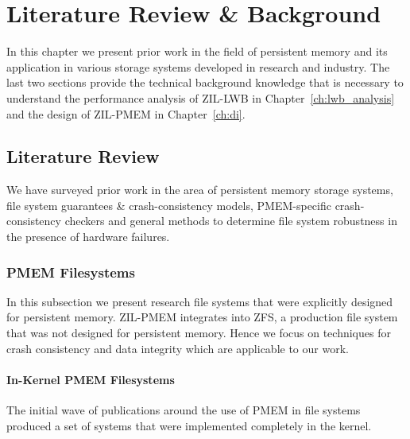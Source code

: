 \documentclass[12pt,a4paper,twoside,draft]{book}
\begin{document}

\chapter{Literature Review \& Background}
In this chapter we present prior work in the field of persistent memory and its application in various storage systems developed in research and industry.
The last two sections provide the technical background knowledge that is necessary to understand the performance analysis of ZIL-LWB in Chapter~\ref{ch:lwb_analysis} and the design of ZIL-PMEM in Chapter~\ref{ch:di}.

\section{Literature Review}
We have surveyed prior work in the area of persistent memory storage systems, file system guarantees \& crash-consistency models, PMEM-specific crash-consistency checkers and general methods to determine file system robustness in the presence of hardware failures.

\subsection{PMEM Filesystems}
In this subsection we present research file systems that were explicitly designed for persistent memory.
ZIL-PMEM integrates into ZFS, a production file system that was not designed for persistent memory.
Hence we focus on techniques for crash consistency and data integrity which are applicable to our work.

\subsubsection{In-Kernel PMEM Filesystems}
The initial wave of publications around the use of PMEM in file systems produced a set of systems that were implemented completely in the kernel.
\end{document}
